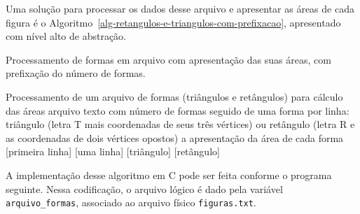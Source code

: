 \documentclass[
  11pt,
  a4paper,
]{scrbook}
\begin{document}
Uma solução para processar os dados desse arquivo e apresentar as áreas
de cada figura é o
Algoritmo~\ref{alg-retangulos-e-triangulos-com-prefixacao}, apresentado
com nível alto de abstração.

\begin{algorithm}[H]
\caption{\label{alg-retangulos-e-triangulos-com-prefixacao}Processamento
de formas em arquivo com apresentação das suas áreas, com prefixação do
número de formas.}
\begingroup%


\begin{algorithmic}
    \Description Processamento de um arquivo de formas (triângulos e retângulos) para cálculo das áreas
    \Require arquivo texto com número de formas seguido de uma forma por linha: triângulo (letra T mais coordenadas de seus três vértices) ou retângulo (letra R e as coordenadas de dois vértices opostos)
    \Ensure a apresentação da área de cada forma
    \Statex{}
    [primeira linha]
        [uma linha]
            [triângulo]
        \Else
            [retângulo]
        \EndIf
    \EndFor
\end{algorithmic}

\endgroup
\end{algorithm}

A implementação desse algoritmo em C pode ser feita conforme o programa
seguinte. Nessa codificação, o arquivo lógico é dado pela variável
\texttt{arquivo\_formas}, associado ao arquivo físico
\texttt{figuras.txt}.
\end{document}
